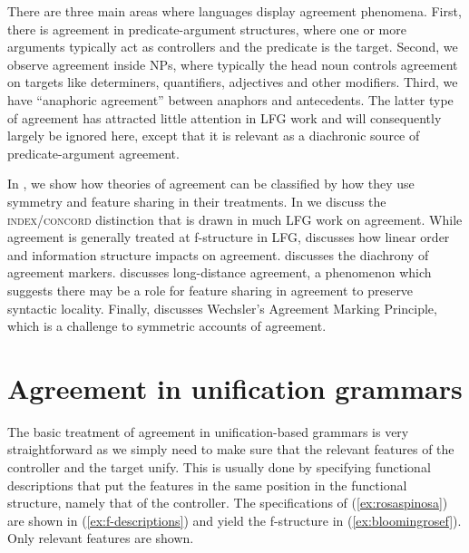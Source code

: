 \documentclass[output=paper,hidelinks]{langscibook}
\begin{document}
There are three main areas where languages display agreement phenomena. First, there is agreement in predicate-argument structures, where one or more arguments typically act as controllers and the predicate is the target. Second, we observe agreement inside NPs, where typically the head noun controls agreement on targets like determiners, quantifiers, adjectives and other modifiers. Third, we have “anaphoric agreement” between anaphors and antecedents. The latter type of agreement has attracted little attention in LFG work and will consequently largely be ignored here, except that it is relevant as a diachronic source of predicate-argument agreement.

In , we show how theories of agreement can be classified by how they use symmetry and feature sharing in their treatments. In  we discuss the \textsc{index}/\textsc{concord} distinction that is drawn in much LFG work on agreement. While agreement is generally treated at f-structure in LFG,  discusses how linear order and information structure impacts on agreement.  discusses the diachrony of agreement markers.  discusses long-distance agreement, a phenomenon which suggests there may be a role for feature sharing in agreement to preserve syntactic locality. Finally,  discusses Wechsler's Agreement Marking Principle, which is a challenge to symmetric accounts of agreement. 

\section{Agreement in unification grammars} \label{sec:symmetry}
The basic treatment of agreement in unification-based grammars is very
straightforward as we simply need to make sure that the relevant
features of the controller and the target unify. This is usually done
by specifying functional descriptions that put the features in the
same position in the functional structure, namely that of the
controller. The specifications of (\ref{ex:rosaspinosa}) are shown in (\ref{ex:f-descriptions}) and
yield the f-structure in (\ref{ex:bloomingrosef}). Only relevant features are shown.
\end{document}
